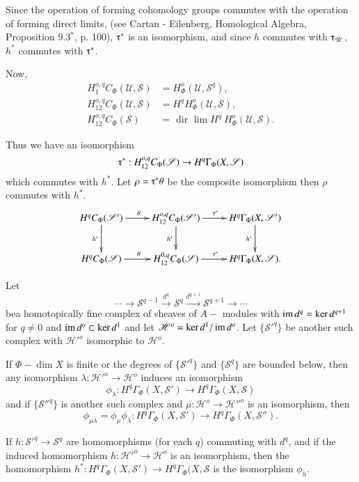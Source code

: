 Since the operation of forming cohomology groups commutes with the
operation of forming direct limits, (see Cartan - Eilenberg,
Homological Algebra, Proposition 9.3$^*$, p. 100), $\tauup^*$ is an
isomorphism, and since $h$ commutes with $\tauup_\mathscr{U}$, $h^*$
commutes with $\tauup^*$. 

Now,
\begin{align*}
H^{o,q}_1  C_\Phi (\mathscr{U},\mathscr{S}) & =
H^o_\Phi(\mathscr{U},\mathscr{S}^q),\\ 
H^{o,q}_{12} C_\Phi (\mathscr{U},\mathscr{S}) & = H^q
H^o_\Phi(\mathscr{U},\mathscr{S}),\\ 
H^{o,q}_{12} C_\Phi (\mathscr{S}) & = \text{ dir } \lim H^q ~
H^o_\Phi(\mathscr{U},\mathscr{S}). 
\end{align*}

Thus we have an isomorphism
$$
\tauup^* : H^{o,q}_{12}  C_\Phi (\mathscr{S}) \rightarrow H^q
\Gamma_{\Phi} (X,\mathscr{S}) 
$$
which commutes with $h^*$. Let $\rho = \tauup^* \theta$ be the
composite isomorphism then $\rho$ commutes with $h^*$. 
\[
\xymatrix{
H^qC_{\Phi}(\mathscr{S}')\ar[r]^{\theta}\ar[d]_{h^{\ast}} &
H^{o,q}_{12} C_{\Phi}(\mathscr{S}')
\ar[r]^{\tau^{\ast}}\ar[d]_{h^{\ast}} & H^q\Gamma_{\Phi}
(X,\mathscr{S}')\ar[d]_{h^{\ast}} \\
H^qC_{\Phi} (\mathscr{S}) \ar[r]^{\theta} & H^{0,q}_{12} C_{\Phi}
(\mathscr{S}) \ar[r]^{\tau^{\ast}} & H^q \Gamma_{\Phi} (X,\mathscr{S}).
}
\]

\begin{thm}%
 Let
$$
\cdots \rightarrow \mathscr{S}^{q-1} \xrightarrow{d^q} \mathscr{S}^q
\xrightarrow{d^{q+1}} \mathscr{S}^{q+1} \rightarrow \cdots 
$$
be\pageoriginale a homotopically fine complex of sheaves of $A-$
modules with $\operatorname{im} 
{d^q} = \ker d^{q+1}$ for $q \neq 0$ and $\operatorname{im} {d^o} \subset \ker
{d^1}$ and let ${\mathscr{H}^o} = \ker {d^1} / \operatorname{im} {d^o} $. Let
$\{\mathscr{S}'^{q}\}$ be another such complex with $\mathscr{H}'^o$
isomorphic to $\mathscr{H}^o$. 

If $\Phi -\dim X$ is finite or the degrees of $\{\mathscr{S}'^q \}$
and $\{\mathscr{S}^q \}$ are bounded below, then any isomorphism
$\lambda : \mathscr{H}'^o \rightarrow \mathscr{H}^o$ induces an
isomorphism 
$$
\phi_\lambda : H^q \Gamma_\Phi (X,\mathscr{S}') \rightarrow H^q
\Gamma_\Phi (X,\mathscr{S}) 
$$
and if $\{\mathscr{S}''^{q} \}$ is another such complex and
  $\mu : \mathscr{H}^o \rightarrow \mathscr{H}''^o$ is an isomorphism,
  then  
$$
\phi_{\mu\lambda} =  \phi_\mu \phi_\lambda : H^q
\Gamma_\Phi(X,\mathscr{S}') \rightarrow H^q \Gamma_\Phi
(X,\mathscr{S}''). 
$$

If $h : \mathscr{S}'^q \rightarrow \mathscr{S}^q$ are homomorphisms
(for each $q$) commuting with $d^q$, and if the induced homomorphism
$h : \mathscr{H}'^o \rightarrow \mathscr{H}^o$ is an isomorphism, then
the homomorphism $h^*: H^q \Gamma_\Phi (X,\mathscr{S}') \rightarrow H^q
\Gamma_\Phi (X,\mathscr{S}$ is the isomorphism $\phi_h$. 
\end{thm}

